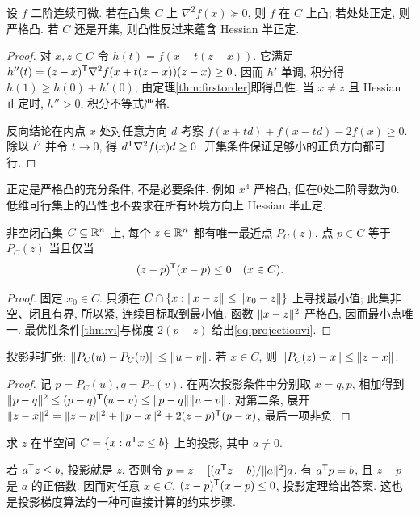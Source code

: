 \begin{theorem}\label{thm:hessian}
设 $f$ 二阶连续可微. 若在凸集 $C$ 上 $\nabla^2f(x)\succeq0$, 则 $f$ 在 $C$ 上凸; 若处处正定, 则严格凸. 若 $C$ 还是开集, 则凸性反过来蕴含 Hessian 半正定.
\end{theorem}
\begin{proof}
对 $x,z\in C$ 令 $h(t)=f(x+t(z-x))$. 它满足 $h''(t)=(z-x)^{\mathsf T}\nabla^2f(x+t(z-x))(z-x)\ge0$. 因而 $h'$ 单调, 积分得 $h(1)\ge h(0)+h'(0)$; 由定理\ref{thm:firstorder}即得凸性. 当 $x\ne z$ 且 Hessian 正定时, $h''>0$, 积分不等式严格.

反向结论在内点 $x$ 处对任意方向 $d$ 考察 $f(x+td)+f(x-td)-2f(x)\ge0$. 除以 $t^2$ 并令 $t\to0$, 得 $d^{\mathsf T}\nabla^2f(x)d\ge0$. 开集条件保证足够小的正负方向都可行.
\end{proof}
正定是严格凸的充分条件, 不是必要条件. 例如 $x^4$ 严格凸, 但在0处二阶导数为0. 低维可行集上的凸性也不要求在所有环境方向上 Hessian 半正定.

\begin{theorem}[投影定理]\label{thm:projection}
非空闭凸集 $C\subseteq\mathbb R^n$ 上, 每个 $z\in\mathbb R^n$ 都有唯一最近点 $P_C(z)$. 点 $p\in C$ 等于 $P_C(z)$ 当且仅当
\begin{equation}\label{eq:projectionvi}
(z-p)^{\mathsf T}(x-p)\le0\quad(x\in C).
\end{equation}
\end{theorem}
\begin{proof}
固定 $x_0\in C$. 只须在 $C\cap\{x:\lVert x-z\rVert\le\lVert x_0-z\rVert\}$ 上寻找最小值; 此集非空、闭且有界, 所以紧, 连续目标取到最小值. 函数 $\lVert x-z\rVert^2$ 严格凸, 因而最小点唯一. 最优性条件\ref{thm:vi}与梯度 $2(p-z)$ 给出\eqref{eq:projectionvi}.
\end{proof}
\begin{corollary}\label{cor:nonexpansive}
投影非扩张: $\lVert P_C(u)-P_C(v)\rVert\le\lVert u-v\rVert$. 若 $x\in C$, 则 $\lVert P_C(z)-x\rVert\le\lVert z-x\rVert$.
\end{corollary}
\begin{proof}
记 $p=P_C(u),q=P_C(v)$. 在两次投影条件中分别取 $x=q,p$, 相加得到 $\lVert p-q\rVert^2\le(p-q)^{\mathsf T}(u-v)\le\lVert p-q\rVert\lVert u-v\rVert$. 对第二条, 展开 $\lVert z-x\rVert^2=\lVert z-p\rVert^2+\lVert p-x\rVert^2+2(z-p)^{\mathsf T}(p-x)$, 最后一项非负.
\end{proof}
\begin{example}
求 $z$ 在半空间 $C=\{x:a^{\mathsf T} x\le b\}$ 上的投影, 其中 $a\ne0$.
\end{example}
\begin{solution}
若 $a^{\mathsf T} z\le b$, 投影就是 $z$. 否则令 $p=z-[(a^{\mathsf T} z-b)/\lVert a\rVert^2]a$. 有 $a^{\mathsf T} p=b$, 且 $z-p$ 是 $a$ 的正倍数. 因而对任意 $x\in C$, $(z-p)^{\mathsf T}(x-p)\le0$, 投影定理给出答案. 这也是投影梯度算法的一种可直接计算的约束步骤.
\end{solution}

